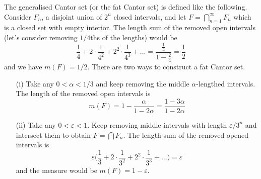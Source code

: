 \begin{defi}
The generalised Cantor set (or the fat Cantor set) is defined like the following. Consider $F_{n}$, a disjoint union of $2^{n}$ closed intervals, and let $F=\bigcap ^{\infty }_{n=1}F_{n}$ which is a closed set with empty interior. The length sum of the removed open intervals (let's consider removing $1/4$ths of the lengths) would be
\[\dfrac{1}{4}+2\cdot \dfrac{1}{4^2}+2^2\cdot \dfrac{1}{4^3}+\ldots =\dfrac{\frac{1}{4}}{1-\frac{2}{4}}=\dfrac{1}{2}\]
and we have $m(F)=1/2$. There are two ways to construct a fat Cantor set.
\begin{itemize}
	\item[(i)] Take any $0<\alpha <1/3$ and keep removing the middle $\alpha $-lengthed intervals. The length of the removed open intervals is 
\[m(F)=1-\dfrac{\alpha }{1-2\alpha }=\dfrac{1-3\alpha }{1-2\alpha }\]
\item[(ii)] Take any $0<\varepsilon <1$. Keep removing middle intervals with length $\varepsilon /3^{n}$ and intersect them to obtain $F=\bigcap F_{n}$. The length sum of the removed opened intervals is
\[\varepsilon \Big(\dfrac{1}{3}+2\cdot \dfrac{1}{3^2}+2^2\cdot \dfrac{1}{3^3}+\ldots \Big)=\varepsilon \]
and the measure would be $m(F)=1-\varepsilon$. 
\end{itemize}
\end{defi}
\vspace{2ex}
